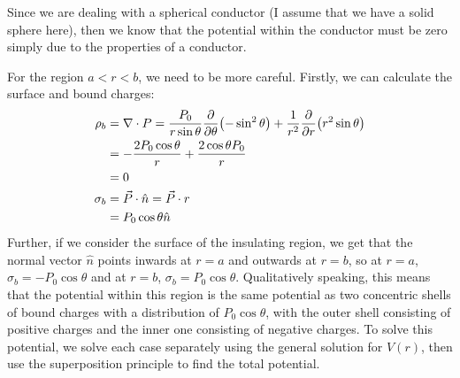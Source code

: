 \documentclass[10pt]{article}
\begin{document}
	\begin{solution}
		Since we are dealing with a spherical conductor (I assume that we have a solid sphere here), then we know
		that the potential within the conductor must be zero simply due to the properties of a conductor. 

		For the region $a < r < b$, we need to be more careful. Firstly, we can calculate the surface and bound
		charges:
		\begin{align*}
			\rho_b &= \nabla \cdot P = \frac{P_0}{r \sin \theta}\pdv{\theta} (-\sin^2 \theta) + \frac{1}{r^2}\pdv{r}
			(r^2 \sin \theta)\\
			&= -\frac{2P_0 \cos \theta}{r} + \frac{2 \cos \theta P_0}{r} \\
			&= 0 \\
			\sigma_b &= \vec P \cdot \hat{n} = \vec P \cdot r \\
			&= P_0 \cos \theta \hat{n}
		\end{align*}
		Further, if we consider the surface of the insulating region, we get that the normal vector $\hat{n}$
		points inwards at $r = a$ and outwards at $r = b$, so at $r = a$, $\sigma_b = -P_0 \cos \theta$ and 
		at $r = b$, $\sigma_b = P_0 \cos \theta$. Qualitatively speaking, this means that the potential 
		within this region is the same potential as two concentric shells of bound charges with a distribution
		of $P_0 \cos \theta$, with the outer shell consisting of positive charges and the inner one consisting
		of negative charges. To solve this potential, we solve each case separately using the general 
		solution for $V(r)$, then use the superposition principle to find the total potential. 


\end{solution}
\end{document}
